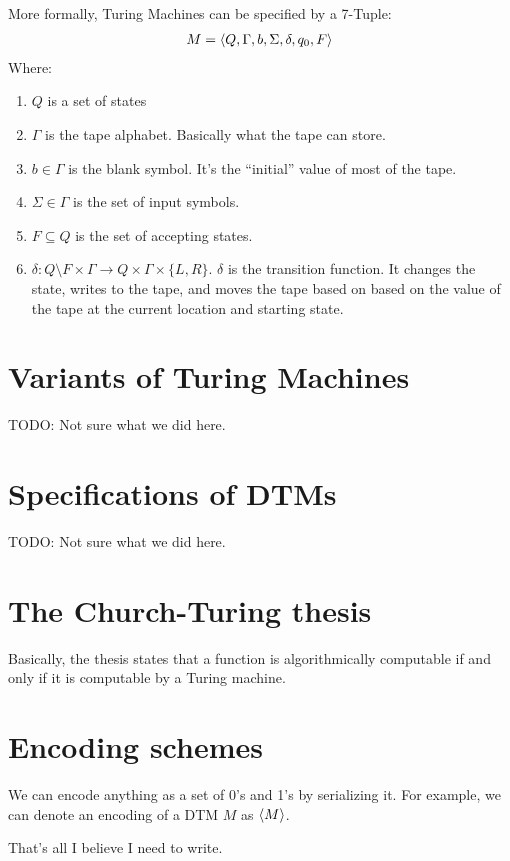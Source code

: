         More formally, Turing Machines can be specified by a 7-Tuple:
        \begin{align*}
            M = \left \langle Q, \Gamma, b, \Sigma, \delta, q_0, F \right \rangle 
        \end{align*}
        Where:
        \begin{enumerate}
            \item $Q$ is a set of states
            \item $\Gamma$ is the tape alphabet. Basically what the tape can
            store.
            \item $b \in \Gamma$ is the blank symbol. It's the ``initial'' value
            of most of the tape.
            \item $\Sigma \in \Gamma$ is the set of input symbols.
            \item $F \subseteq Q$ is the set of accepting states.
            \item $\delta: Q \setminus F \times \Gamma \to Q \times \Gamma \times \{ L, R \}$.
                $\delta$ is the transition function. It changes the state,
                writes to the tape, and moves the tape based on based on the
                value of the tape at the current location and starting state.
        \end{enumerate}
    \section{Variants of Turing Machines}
        TODO: Not sure what we did here.
    \section{Specifications of DTMs}
        TODO: Not sure what we did here.
    \section{The Church-Turing thesis}
        Basically, the thesis states that a function is algorithmically
        computable if and only if it is computable by a Turing machine.
    \section{Encoding schemes}
        We can encode anything as a set of 0's and 1's by serializing it. For
        example, we can denote an encoding of a DTM $M$ as $\left \langle M \right \rangle $.

        That's all I believe I need to write.

